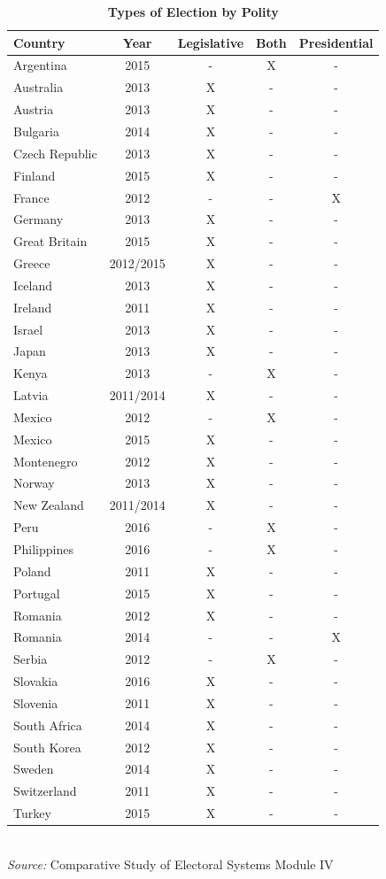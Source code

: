 \documentclass[12pt, titlepage]{article}
\newcommand\e{\emph}
\newcommand\tb{\textbf}
\begin{document}
\begin{table}
	\centering
	\caption{\tb{Types of Election by Polity}}
	\begin{tabulary}{\textwidth}{l c c c c} 
		\hline
		\tb{Country}&\tb{Year}&\tb{Legislative}&\tb{Both}&\tb{Presidential}\\
		\hline
		Argentina&2015&-&X&-\\
		Australia&2013&X&-&-\\
		Austria&2013&X&-&-\\
		Bulgaria&2014&X&-&-\\
		Czech Republic&2013&X&-&-\\
		Finland&2015&X&-&-\\
		France&2012&-&-&X\\
		Germany&2013&X&-&-\\ 
		Great Britain&2015&X&-&-\\
		Greece&2012/2015&X&-&-\\
		Iceland&2013&X&-&-\\
		Ireland&2011&X&-&-\\
		Israel&2013&X&-&-\\
		Japan&2013&X&-&-\\
		Kenya&2013&-&X&-\\
		Latvia&2011/2014&X&-&-\\
		Mexico&2012&-&X&-\\
		Mexico&2015&X&-&-\\
		Montenegro&2012&X&-&-\\
		Norway&2013&X&-&-\\
		New Zealand&2011/2014&X&-&-\\
		Peru&2016&-&X&-\\
		Philippines&2016&-&X&-\\
		Poland&2011&X&-&-\\
		Portugal&2015&X&-&-\\	
		Romania&2012&X&-&-\\
		Romania&2014&-&-&X\\
		Serbia&2012&-&X&-\\
		Slovakia&2016&X&-&-\\
		Slovenia&2011&X&-&-\\
		South Africa&2014&X&-&-\\ 
		South Korea&2012&X&-&-\\
		Sweden&2014&X&-&-\\
		Switzerland&2011&X&-&-\\
		Turkey&2015&X&-&-\\
		\hline
	\end{tabulary} \\
	\e{Source:} Comparative Study of Electoral Systems Module IV 
	\label{table1}
\end{table}
\end{document}
